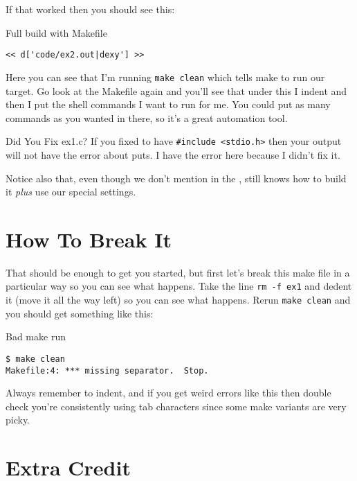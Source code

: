 If that worked then you should see this:

\begin{Terminal}{Full build with Makefile}
\begin{lstlisting}
<< d['code/ex2.out|dexy'] >>
\end{lstlisting}
\end{Terminal}

Here you can see that I'm running \verb|make clean| which tells
make to run our  target.  Go look at the Makefile
again and you'll see that under this I indent and then I put
the shell commands I want  to run for me.  You could
put as many commands as you wanted in there, so it's a great
automation tool.

\begin{aside}{Did You Fix ex1.c?}
If you fixed  to have \verb|#include <stdio.h>| then your
output will not have the error about puts.  I have the error
here because I didn't fix it.
\end{aside}

Notice also that, even though we don't mention  in the
,  still knows how to build it \emph{plus}
use our special settings.


\section{How To Break It}

That should be enough to get you started, but first let's break this 
make file in a particular way so you can see what happens.  Take
the line \verb|rm -f ex1| and dedent it (move it all the way left)
so you can see what happens.  Rerun \verb|make clean| and you should
get something like this:

\begin{Terminal}{Bad make run}
\begin{lstlisting}
$ make clean
Makefile:4: *** missing separator.  Stop.
\end{lstlisting}
\end{Terminal}

Always remember to indent, and if you get weird errors like this
then double check you're consistently using tab characters since
some make variants are very picky.

\section{Extra Credit}

